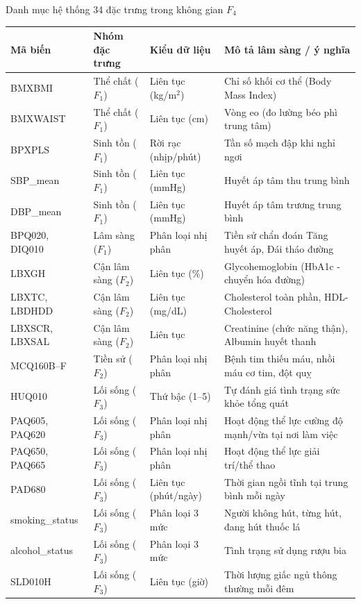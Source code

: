 \begin{table}{Danh mục hệ thống 34 đặc trưng trong không gian $F_4$}
\centering
\small
\label{tab:feature-inventory}
\begin{tabularx}{\textwidth}{p{2.5cm} p{2.2cm} p{2.5cm} X}
\toprule
\textbf{Mã biến} & \textbf{Nhóm đặc trưng} & \textbf{Kiểu dữ liệu} & \textbf{Mô tả lâm sàng / ý nghĩa} \\
\midrule
BMXBMI & Thể chất ($F_1$) & Liên tục (kg/m$^2$) & Chỉ số khối cơ thể (Body Mass Index) \\
BMXWAIST & Thể chất ($F_1$) & Liên tục (cm) & Vòng eo (đo lường béo phì trung tâm) \\
BPXPLS & Sinh tồn ($F_1$) & Rời rạc (nhịp/phút) & Tần số mạch đập khi nghỉ ngơi \\
SBP\_mean & Sinh tồn ($F_1$) & Liên tục (mmHg) & Huyết áp tâm thu trung bình \\
DBP\_mean & Sinh tồn ($F_1$) & Liên tục (mmHg) & Huyết áp tâm trương trung bình \\
BPQ020, DIQ010 & Lâm sàng ($F_1$) & Phân loại nhị phân & Tiền sử chẩn đoán Tăng huyết áp, Đái tháo đường \\
\midrule
LBXGH & Cận lâm sàng ($F_2$) & Liên tục (\%) & Glycohemoglobin (HbA1c - chuyển hóa đường) \\
LBXTC, LBDHDD & Cận lâm sàng ($F_2$) & Liên tục (mg/dL) & Cholesterol toàn phần, HDL-Cholesterol \\
LBXSCR, LBXSAL & Cận lâm sàng ($F_2$) & Liên tục & Creatinine (chức năng thận), Albumin huyết thanh \\
MCQ160B--F & Tiền sử ($F_2$) & Phân loại nhị phân & Bệnh tim thiếu máu, nhồi máu cơ tim, đột quỵ \\
\midrule
HUQ010 & Lối sống ($F_3$) & Thứ bậc (1--5) & Tự đánh giá tình trạng sức khỏe tổng quát \\
PAQ605, PAQ620 & Lối sống ($F_3$) & Phân loại nhị phân & Hoạt động thể lực cường độ mạnh/vừa tại nơi làm việc \\
PAQ650, PAQ665 & Lối sống ($F_3$) & Phân loại nhị phân & Hoạt động thể lực giải trí/thể thao \\
PAD680 & Lối sống ($F_3$) & Liên tục (phút/ngày) & Thời gian ngồi tĩnh tại trung bình mỗi ngày \\
smoking\_status & Lối sống ($F_3$) & Phân loại 3 mức & Người không hút, từng hút, đang hút thuốc lá \\
alcohol\_status & Lối sống ($F_3$) & Phân loại 3 mức & Tình trạng sử dụng rượu bia \\
SLD010H & Lối sống ($F_3$) & Liên tục (giờ) & Thời lượng giấc ngủ thông thường mỗi đêm \\

\end{tabularx}
\end{table}
